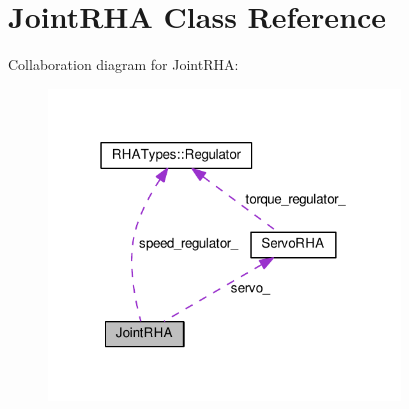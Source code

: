 \hypertarget{classJointRHA}{}\section{Joint\+R\+HA Class Reference}
\label{classJointRHA}


Collaboration diagram for Joint\+R\+HA\+:
\nopagebreak
\begin{figure}[H]
\begin{center}
\leavevmode
\includegraphics[width=265pt]{classJointRHA__coll__graph}
\end{center}
\end{figure}
